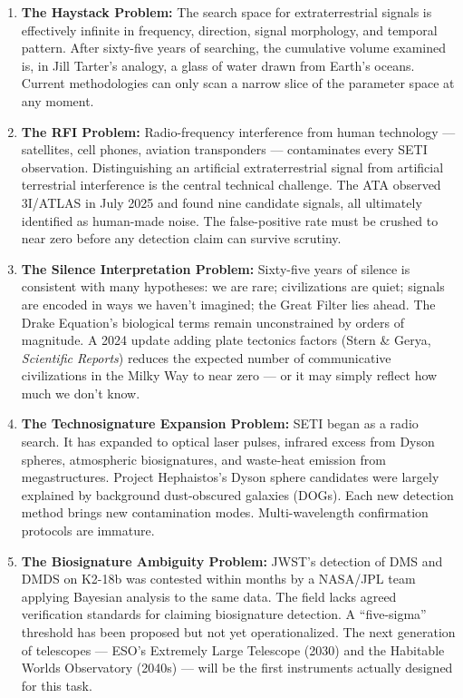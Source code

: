 \documentclass[11pt,letterpaper]{article}
\begin{document}
\begin{enumerate}[leftmargin=1.5em]
  \item \textbf{The Haystack Problem:} The search space for extraterrestrial signals is effectively infinite in frequency, direction, signal morphology, and temporal pattern. After sixty-five years of searching, the cumulative volume examined is, in Jill Tarter's analogy, a glass of water drawn from Earth's oceans. Current methodologies can only scan a narrow slice of the parameter space at any moment.

  \item \textbf{The RFI Problem:} Radio-frequency interference from human technology --- satellites, cell phones, aviation transponders --- contaminates every SETI observation. Distinguishing an artificial extraterrestrial signal from artificial terrestrial interference is the central technical challenge. The ATA observed 3I/ATLAS in July 2025 and found nine candidate signals, all ultimately identified as human-made noise. The false-positive rate must be crushed to near zero before any detection claim can survive scrutiny.

  \item \textbf{The Silence Interpretation Problem:} Sixty-five years of silence is consistent with many hypotheses: we are rare; civilizations are quiet; signals are encoded in ways we haven't imagined; the Great Filter lies ahead. The Drake Equation's biological terms remain unconstrained by orders of magnitude. A 2024 update adding plate tectonics factors (Stern \& Gerya, \textit{Scientific Reports}) reduces the expected number of communicative civilizations in the Milky Way to near zero --- or it may simply reflect how much we don't know.

  \item \textbf{The Technosignature Expansion Problem:} SETI began as a radio search. It has expanded to optical laser pulses, infrared excess from Dyson spheres, atmospheric biosignatures, and waste-heat emission from megastructures. Project Hephaistos's Dyson sphere candidates were largely explained by background dust-obscured galaxies (DOGs). Each new detection method brings new contamination modes. Multi-wavelength confirmation protocols are immature.

  \item \textbf{The Biosignature Ambiguity Problem:} JWST's detection of DMS and DMDS on K2-18b was contested within months by a NASA/JPL team applying Bayesian analysis to the same data. The field lacks agreed verification standards for claiming biosignature detection. A ``five-sigma'' threshold has been proposed but not yet operationalized. The next generation of telescopes --- ESO's Extremely Large Telescope (2030) and the Habitable Worlds Observatory (2040s) --- will be the first instruments actually designed for this task.
\end{enumerate}
\end{document}
